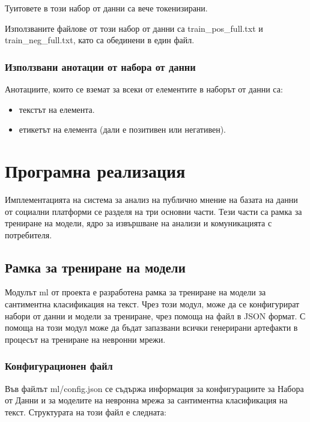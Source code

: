 \documentclass{article}
\begin{document}
    Туитовете в този набор от данни са вече токенизирани. \cite{epfl}

    Използваните файлове от този набор от данни са train\_pos\_full.txt и train\_neg\_full.txt, като са обединени в един
    файл.

    \subsubsection{Използвани анотации от набора от данни}

    Анотациите, които се вземат за всеки от елементите в наборът от данни са:

    \begin{itemize}

        \item текстът на елемента.
        \item етикетът на елемента (дали е позитивен или негативен).

    \end{itemize}

    \newpage


    \section{Програмна реализация}

    Имплементацията на система за анализ на публично мнение на базата на данни от социални платформи се разделя на три
    основни части. Тези части са рамка за трениране на модели, ядро за извършване на анализи и комуникацията с потребителя.

    \subsection{Рамка за трениране на модели}

    Модулът ml от проекта е разработена рамка за трениране на модели за сантиментна класификация на текст. Чрез този модул,
    може да се конфигурират набори от данни и модели за трениране, чрез помоща на файл в JSON формат. С помоща на този
    модул може да бъдат запазвани всички генерирани артефакти в процесът на трениране на невронни мрежи.

    \subsubsection{Конфигурационен файл}

    Във файлът ml/config.json се съдържа информация за конфигурациите за Набора от Данни и за моделите на невронна мрежа за
    сантиментна класификация на текст. Структурата на този файл е следната:
\end{document}

